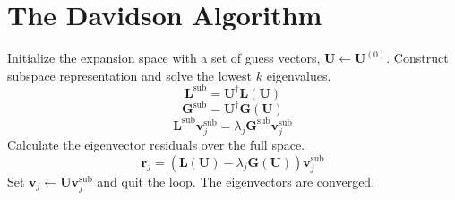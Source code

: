 \section{The Davidson Algorithm}
\label{sec:davidson:davidson}

\begin{algorithm}
    \caption{%
        Canonical multiroot Davidson algorithm for a generic eigenvalue problem,
        $\mathbf{L}\mathbf{v}_j=\lambda_j\mathbf{G}\mathbf{v}_j$, with periodic
        subspace collapse.
        Requires linear transformation functions and diagonal approximations
        (indicated by tildes) for \(\mathbf{L}\) and \(\mathbf{G}\)
        and solves for the lowest \(k\) eigenvalues and eigenvectors.
    }
    \label{algo:davidson}
    \begin{algorithmic}[1]
        \State
        Initialize the expansion space with a set of guess vectors,
        \(\mathbf{U}\leftarrow\mathbf{U}^{(0)}\).
            \State
            Construct subspace representation and solve the lowest \(k\)
            eigenvalues.
            \[
                \mathbf{L}^\mathrm{sub}
                =
                \mathbf{U}^\dagger
                \mathbf{L}(\mathbf{U})
            \]
            \[
                \mathbf{G}^\mathrm{sub}
                =
                \mathbf{U}^\dagger
                \mathbf{G}(\mathbf{U})
            \]
            \[
                \mathbf{L}^\mathrm{sub}
                \mathbf{v}_j^\mathrm{sub}
                =
                \lambda_j
                \mathbf{G}^\mathrm{sub}
                \mathbf{v}_j^\mathrm{sub}
            \]
            \State
            Calculate the eigenvector residuals over the full space.
            \[
                \mathbf{r}_j
                =
                (
                    \mathbf{L}(\mathbf{U})
                    -
                    \lambda_j
                    \mathbf{G}(\mathbf{U})
                )
                \mathbf{v}_j^\mathrm{sub}
            \]
                \State
                Set
                \(\mathbf{v}_j\leftarrow\mathbf{U}\mathbf{v}_j^\mathrm{sub}\)
                and quit the loop.  The eigenvectors are converged.

\end{algorithmic}
\end{algorithm}
